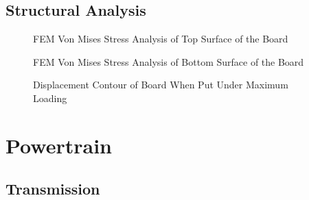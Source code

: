 \documentclass[journal,10pt]{IEEEtran}
\begin{document}
    \subsection{Structural Analysis}
        \begin{figure}[H]
            \centering
            \caption{FEM Von Mises Stress Analysis of Top Surface of the Board
            }
            \label{fig:stressTop}
        \end{figure}
        \begin{figure}[H]
            \centering
            \caption{FEM Von Mises Stress Analysis of Bottom Surface of the Board
            }
            \label{fig:stressBottom}
        \end{figure}
        \begin{figure}[H]
                \centering
                \caption{Displacement Contour of Board When Put Under Maximum Loading
                }
                \label{fig:Displacement}
            \end{figure}
    
\section{Powertrain}
    \subsection{Transmission}
\end{document}
